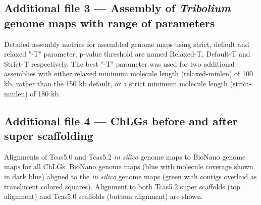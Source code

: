 \documentclass{bmcart}
\begin{document}
\begin{backmatter}
  \subsection*{Additional file 3 --- Assembly of \textit{Tribolium} genome maps with range of parameters}
    Detailed assembly metrics for assembled genome maps using strict, default and relaxed "-T" parameter, p-value threshold are named Relaxed-T, Default-T and Strict-T respectively. The best "-T" parameter was used for two additional assemblies with either relaxed minimum molecule length (relaxed-minlen) of 100 kb, rather than the 150 kb default, or a strict minimum molecule length (strict-minlen) of 180 kb. 

  \subsection*{Additional file 4 --- ChLGs before and after super scaffolding }
    Alignments of Tcas5.0 and Tcas5.2 \textit{in silico} genome maps to BioNano genome maps for all ChLGs. BioNano genome maps (blue with molecule coverage shown in dark blue) aligned to the \textit{in silico} genome maps (green with contigs overlaid as translucent colored squares). Alignment to both Tcas5.2 super scaffolds (top alignment) and Tcas5.0 scaffolds (bottom alignment) are shown.



\end{backmatter}
\end{document}
